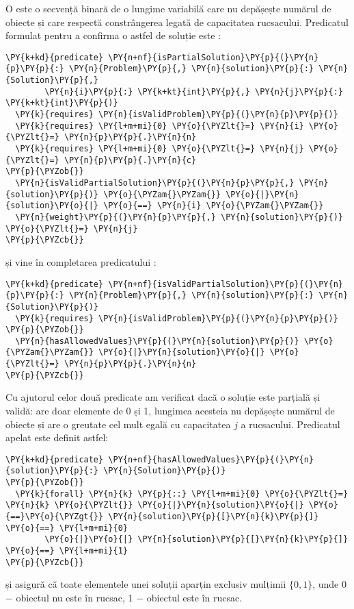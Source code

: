 \begin{sloppypar}
\par O  este o secvență binară de o lungime variabilă care nu depășește numărul de obiecte și care respectă constrângerea legată de capacitatea rucsacului. Predicatul formulat pentru a confirma o astfel de soluție este :
    \begin{Verbatim}[commandchars=\\\{\}]
\PY{k+kd}{predicate} \PY{n+nf}{isPartialSolution}\PY{p}{(}\PY{n}{p}\PY{p}{:} \PY{n}{Problem}\PY{p}{,} \PY{n}{solution}\PY{p}{:} \PY{n}{Solution}\PY{p}{,} 
        \PY{n}{i}\PY{p}{:} \PY{k+kt}{int}\PY{p}{,} \PY{n}{j}\PY{p}{:} \PY{k+kt}{int}\PY{p}{)}
  \PY{k}{requires} \PY{n}{isValidProblem}\PY{p}{(}\PY{n}{p}\PY{p}{)}
  \PY{k}{requires} \PY{l+m+mi}{0} \PY{o}{\PYZlt{}=} \PY{n}{i} \PY{o}{\PYZlt{}=} \PY{n}{p}\PY{p}{.}\PY{n}{n}
  \PY{k}{requires} \PY{l+m+mi}{0} \PY{o}{\PYZlt{}=} \PY{n}{j} \PY{o}{\PYZlt{}=} \PY{n}{p}\PY{p}{.}\PY{n}{c}
\PY{p}{\PYZob{}}
  \PY{n}{isValidPartialSolution}\PY{p}{(}\PY{n}{p}\PY{p}{,} \PY{n}{solution}\PY{p}{)} \PY{o}{\PYZam{}\PYZam{}} \PY{o}{|}\PY{n}{solution}\PY{o}{|} \PY{o}{==} \PY{n}{i} \PY{o}{\PYZam{}\PYZam{}}
  \PY{n}{weight}\PY{p}{(}\PY{n}{p}\PY{p}{,} \PY{n}{solution}\PY{p}{)} \PY{o}{\PYZlt{}=} \PY{n}{j}
\PY{p}{\PYZcb{}}
\end{Verbatim}
    și vine în completarea predicatului :
    \begin{Verbatim}[commandchars=\\\{\}]
\PY{k+kd}{predicate} \PY{n+nf}{isValidPartialSolution}\PY{p}{(}\PY{n}{p}\PY{p}{:} \PY{n}{Problem}\PY{p}{,} \PY{n}{solution}\PY{p}{:} \PY{n}{Solution}\PY{p}{)}
  \PY{k}{requires} \PY{n}{isValidProblem}\PY{p}{(}\PY{n}{p}\PY{p}{)}
\PY{p}{\PYZob{}}
  \PY{n}{hasAllowedValues}\PY{p}{(}\PY{n}{solution}\PY{p}{)} \PY{o}{\PYZam{}\PYZam{}} \PY{o}{|}\PY{n}{solution}\PY{o}{|} \PY{o}{\PYZlt{}=} \PY{n}{p}\PY{p}{.}\PY{n}{n}
\PY{p}{\PYZcb{}}
\end{Verbatim}
\par Cu ajutorul celor două predicate am verificat dacă o soluție este parțială și validă: are doar elemente de 0 și 1, lungimea acesteia nu depășește numărul de obiecte și are o greutate cel mult egală cu capacitatea $j$ a rucsacului. Predicatul apelat  este definit astfel:
    \begin{Verbatim}[commandchars=\\\{\}]
\PY{k+kd}{predicate} \PY{n+nf}{hasAllowedValues}\PY{p}{(}\PY{n}{solution}\PY{p}{:} \PY{n}{Solution}\PY{p}{)}
\PY{p}{\PYZob{}}
  \PY{k}{forall} \PY{n}{k} \PY{p}{::} \PY{l+m+mi}{0} \PY{o}{\PYZlt{}=} \PY{n}{k} \PY{o}{\PYZlt{}} \PY{o}{|}\PY{n}{solution}\PY{o}{|} \PY{o}{==}\PY{o}{\PYZgt{}} \PY{n}{solution}\PY{p}{[}\PY{n}{k}\PY{p}{]} \PY{o}{==} \PY{l+m+mi}{0} 
        \PY{o}{|}\PY{o}{|} \PY{n}{solution}\PY{p}{[}\PY{n}{k}\PY{p}{]} \PY{o}{==} \PY{l+m+mi}{1}
\PY{p}{\PYZcb{}}
\end{Verbatim}
    și asigură că toate elementele unei soluții aparțin exclusiv mulțimii $\{0, 1\}$, unde 0 \(-\) obiectul nu este în rucsac, 1 \(-\) obiectul este în rucsac.

\end{sloppypar}